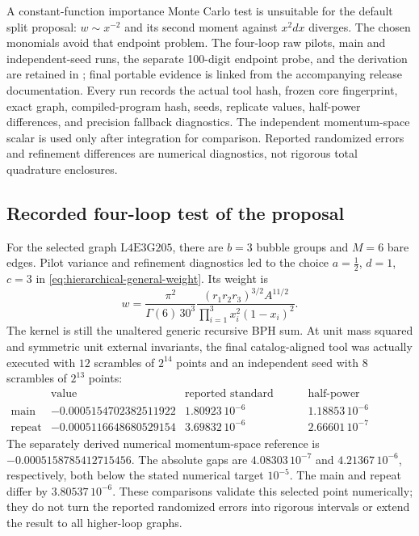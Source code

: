 A constant-function importance Monte Carlo test is unsuitable for the
default split proposal: $w\sim x^{-2}$ and its second moment against
$x^2dx$ diverges.  The chosen monomials avoid that endpoint problem.  The
four-loop raw pilots, main and independent-seed runs, the separate
100-digit endpoint probe, and the derivation are retained in
; final portable evidence is linked
from the accompanying release documentation.  Every run records the
actual tool hash, frozen core fingerprint, exact graph, compiled-program
hash, seeds, replicate values, half-power differences, and precision
fallback diagnostics.  The independent momentum-space scalar is used
only after integration for comparison.  Reported randomized errors and
refinement differences are numerical diagnostics, not rigorous total
quadrature enclosures.

\subsection{Recorded four-loop test of the proposal}

For the selected graph $\mathrm{L4E3G205}$, there are $b=3$ bubble groups
and $M=6$ bare edges.  Pilot variance and refinement diagnostics led to the
choice $a=\tfrac12$, $d=1$, $c=3$ in
\eqref{eq:hierarchical-general-weight}.  Its weight is
\[
 w=\frac{\pi^2}{\Gamma(6)\,30^3}
       \frac{(r_1r_2r_3)^{3/2}A^{11/2}}
       {\prod_{i=1}^3x_i^2(1-x_i)^2}.
\]
The kernel is still the unaltered generic recursive BPH sum.  At unit mass
squared and symmetric unit external invariants, the final catalog-aligned
tool was actually executed with $12$ scrambles of $2^{14}$ points and an
independent seed with $8$ scrambles of $2^{13}$ points:
\[
\begin{array}{c|r|c|c}
 &\text{value}&\text{reported standard error}
             &\text{half-power difference}\\ \hline
 \text{main}&-0.0005154702382511922&1.80923\,10^{-6}&1.18853\,10^{-6}\\
 \text{repeat}&-0.0005116648680529154&3.69832\,10^{-6}&2.66601\,10^{-7}
\end{array}
\]
The separately derived numerical momentum-space reference is
$-0.0005158785412715456$.  The absolute gaps are
$4.08303\,10^{-7}$ and $4.21367\,10^{-6}$, respectively, both below the
stated numerical target $10^{-5}$.  The main and repeat differ by
$3.80537\,10^{-6}$.  These comparisons validate this selected point
numerically; they do not turn the reported randomized errors into rigorous
intervals or extend the result to all higher-loop graphs.

